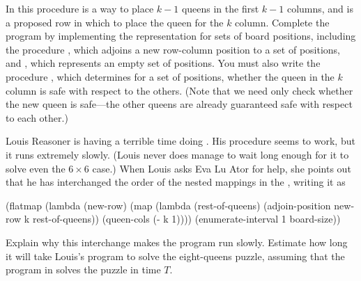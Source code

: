\begin{exercise}
	In this procedure  is a way to place \( k - 1 \) queens in the first \( k - 1 \) columns, and  is a proposed row in which to place the queen for the \( k \) column.
	Complete the program by implementing the representation for sets of board positions, including the procedure , which adjoins a new row-column position to a set of positions, and , which represents an empty set of positions.
	You must also write the procedure , which determines for a set of positions, whether the queen in the \( k \) column is safe with respect to the others.
	(Note that we need only check whether the new queen is safe---the other queens are already guaranteed safe with respect to each other.)
\end{exercise}



\begin{exercise}
	\label{Exercise 2.43}
	Louis Reasoner is having a terrible time doing .
	His  procedure seems to work, but it runs extremely slowly.
	(Louis never does manage to wait long enough for it to solve even the \( 6 × 6 \) case.)
	When Louis asks Eva Lu Ator for help, she points out that he has interchanged the order of the nested mappings in the , writing it as
	\begin{scheme}
	  (flatmap
	   (lambda (new-row)
	     (map (lambda (rest-of-queens)
	            (adjoin-position new-row k rest-of-queens))
	          (queen-cols (- k 1))))
	   (enumerate-interval 1 board-size))
	\end{scheme}
	Explain why this interchange makes the program run slowly.
	Estimate how long it will take Louis’s program to solve the eight-queens puzzle, assuming that the program in  solves the puzzle in time \( T \).
\end{exercise}
